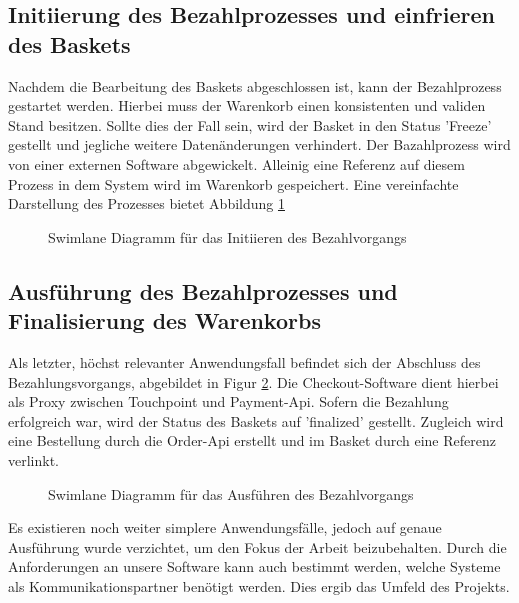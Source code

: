 \subsection{Initiierung des Bezahlprozesses und einfrieren des Baskets}

Nachdem die Bearbeitung des Baskets abgeschlossen ist, kann der Bezahlprozess gestartet werden. Hierbei muss der Warenkorb einen konsistenten und validen Stand besitzen. Sollte dies der Fall sein, wird der Basket in den Status 'Freeze' gestellt und jegliche weitere Datenänderungen verhindert. Der Bazahlprozess wird von einer externen Software abgewickelt. Alleinig eine Referenz auf diesem Prozess in dem System wird im Warenkorb gespeichert. Eine vereinfachte Darstellung des Prozesses bietet Abbildung \ref{fig:SL-InitPayment}

\begin{figure}[htbp]
	\centering
	
	\caption{Swimlane Diagramm für das Initiieren des Bezahlvorgangs }
	\label{fig:SL-InitPayment}
\end{figure}

\subsection{Ausführung des Bezahlprozesses und Finalisierung des Warenkorbs}

Als letzter, höchst relevanter Anwendungsfall befindet sich der Abschluss des Bezahlungsvorgangs, abgebildet in Figur \ref{fig:SL-ExecPayment}. Die Checkout-Software dient hierbei als Proxy zwischen Touchpoint und Payment-Api. Sofern die Bezahlung erfolgreich war, wird der Status des Baskets auf 'finalized' gestellt. Zugleich wird eine Bestellung durch die Order-Api erstellt und im Basket durch eine Referenz verlinkt.

\begin{figure}[htbp]
	\centering
	
	\caption{Swimlane Diagramm für das Ausführen des Bezahlvorgangs }
	\label{fig:SL-ExecPayment}
\end{figure}

Es existieren noch weiter simplere Anwendungsfälle, jedoch auf genaue Ausführung wurde verzichtet, um den Fokus der Arbeit beizubehalten. Durch die Anforderungen an unsere Software kann auch bestimmt werden, welche Systeme als Kommunikationspartner benötigt werden. Dies ergib das Umfeld des Projekts. 

